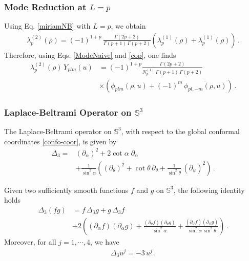 \documentclass[aps,twocolumn,nofootinbib]{revtex4}
\begin{document}
{\begin{appendix}
\subsubsection{Mode Reduction at $L = p$}

Using Eq. \eqref{miriamNB} with $L=p$, we obtain
\begin{align}
    \lambda^{(2)}_p(\rho) = (-1)^{1+p}\, \frac{\Gamma(2p+2)}{\Gamma(p+1) \,\Gamma(p+2)}\left(\lambda^{(1)}_p(\rho) + \overline{\lambda^{(1)}_p(\rho)}\right) \,.
\end{align}
Therefore, using Eqs. \eqref{ModeNaive} and \eqref{cop}, one finds
\begin{align} \label{second-sol-First}
    \lambda_p^{(2)}(\rho)\,Y_{plm}(u) &= (-1)^{1+p} \frac{\Gamma(2p+2)} {N_p^{(1)}\,\Gamma(p+1)\,\Gamma(p+2)}\nonumber\\
    &\times \left(\phi^{}_{plm}(\rho,u)+(-1)^m\, \overline{\phi^{}_{pl,-m}(\rho,u)}\right) \,.
\end{align}


\subsubsection{Laplace-Beltrami Operator on ${\mathbb{S}}^3$}\label{A-Lap-Belt}

The Laplace-Beltrami operator on ${\mathbb{S}}^3$, with respect to the global conformal coordinates \eqref{confo-coor}, is given by
\begin{align}
    \Delta_3 =& \left(\partial_\alpha\right)^2 + 2 \cot\alpha\; \partial_\alpha \nonumber\\
    & + \frac{1}{\sin^2 \alpha} \left(\left(\partial_\theta\right)^2 + \cot\theta\,\partial_\theta + \frac{1}{\sin^2 \theta}\,\left(\partial_\psi\right)^2 \right)\,.
\end{align}

Given two sufficiently smooth functions $f$ and $g$ on ${\mathbb{S}}^3$, the following identity holds
\begin{align}
\Delta_{3}(fg) &= f\,\Delta_{3}g + g\,\Delta_{3}f \nonumber \\
&+2\left( (\partial_{\alpha}f)(\partial_{\alpha}g) + \frac{(\partial_{\theta}f)(\partial_{\theta}g)}{\sin^{2}\alpha} + \frac{(\partial_{\psi}f)(\partial_{\psi}g)}{\sin^{2}\alpha\,\sin^{2}\theta} \right)\,. \label{LB-product-rule}
\end{align}
Moreover, for all $j = 1,\cdots,4$, we have
\begin{align}\label{delta on u}
    \Delta_3 u^j = -3\,u^j \,.
\end{align}



\end{appendix}}
\end{document}
